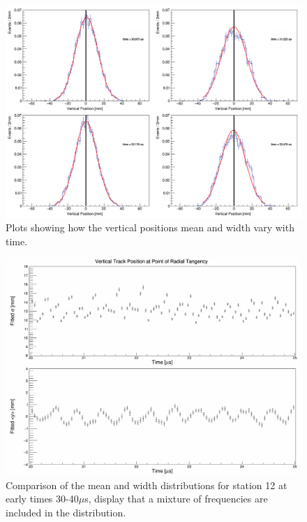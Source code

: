 \begin{figure}[!h]
\centering 
\includegraphics[scale=0.5]{Figures/verticalpositions.png}
\decoRule
\caption{Plots showing how the vertical positions mean and width vary with time.}
\label{fig:verticalpositions.png}
\end{figure}

\begin{figure}[!h]
\centering 
\includegraphics[scale=0.2]{Figures/Width_mean_comparison_station12.png}
\decoRule
\caption{Comparison of the mean and width distributions for station 12 at early times 30-40$\mu$s, display that a mixture of frequencies are included in the distribution.}
\label{fig:Width_mean_comparison_station12}
\end{figure}

